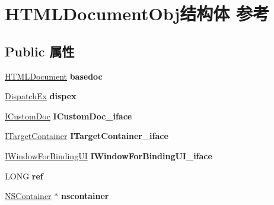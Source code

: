 \hypertarget{struct_h_t_m_l_document_obj}{}\section{H\+T\+M\+L\+Document\+Obj结构体 参考}
\label{struct_h_t_m_l_document_obj}
\subsection*{Public 属性}
\begin{DoxyCompactItemize}
\item 
\mbox{\label{struct_h_t_m_l_document_obj_abc4509e65c5f90c1cb4c503ca1e20f39}} 
\hyperlink{struct_h_t_m_l_document}{H\+T\+M\+L\+Document} {\bfseries basedoc}
\item 
\mbox{\label{struct_h_t_m_l_document_obj_a304fee0c0d16df948b185e2a942ad5f6}} 
\hyperlink{struct_dispatch_ex}{Dispatch\+Ex} {\bfseries dispex}
\item 
\mbox{\label{struct_h_t_m_l_document_obj_adabb031900b0dd15025003792231d6dd}} 
\hyperlink{interface_i_custom_doc}{I\+Custom\+Doc} {\bfseries I\+Custom\+Doc\+\_\+iface}
\item 
\mbox{\label{struct_h_t_m_l_document_obj_afa5507d0f7cf5c80f73fe36d43056bdb}} 
\hyperlink{interface_i_target_container}{I\+Target\+Container} {\bfseries I\+Target\+Container\+\_\+iface}
\item 
\mbox{\label{struct_h_t_m_l_document_obj_aa8f53944a3bd498c818bab07702931e3}} 
\hyperlink{interface_i_window_for_binding_u_i}{I\+Window\+For\+Binding\+UI} {\bfseries I\+Window\+For\+Binding\+U\+I\+\_\+iface}
\item 
\mbox{\label{struct_h_t_m_l_document_obj_a4ed2842bab1026955ae60155678d2e9f}} 
L\+O\+NG {\bfseries ref}
\item 
\mbox{\label{struct_h_t_m_l_document_obj_a21473bae636f698d1a69e77284bead2e}} 
\hyperlink{struct_n_s_container}{N\+S\+Container} $\ast$ {\bfseries nscontainer}
\item 

\end{DoxyCompactItemize}
